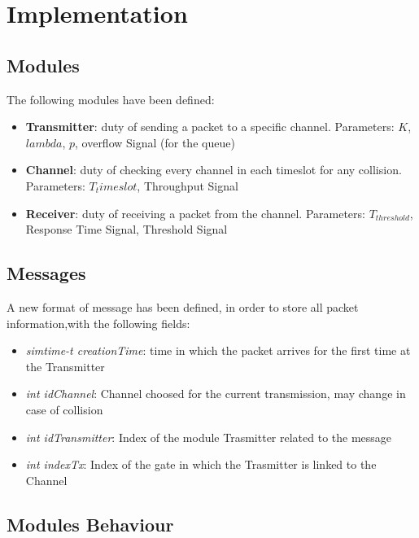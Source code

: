 \section{Implementation}
\subsection{Modules}
The following modules have been defined:
\begin{itemize}
	\item \textbf{Transmitter}: duty of sending a packet to a specific channel. Parameters: $K$, $lambda$, $p$, overflow Signal (for the queue)
	\item \textbf{Channel}: duty of checking every channel in each timeslot for any collision. Parameters: $T_timeslot$, Throughput Signal
	\item \textbf{Receiver}: duty of receiving a packet from the channel. Parameters: $T_{threshold}$, Response Time Signal, Threshold Signal
\end{itemize}
\subsection{Messages}
A new format of message has been defined, in order to store all packet information,with the following fields:
\begin{itemize}
	\item \textit{simtime-t creationTime}: time in which the packet arrives for the first time at the Transmitter
	\item \textit{int idChannel}: Channel choosed for the current transmission, may change in case of collision
	\item \textit{int idTransmitter}: Index of the module Trasmitter related to the message
	\item \textit{int indexTx}: Index of the gate in which the Trasmitter is linked to the Channel
\end{itemize}

\subsection{Modules Behaviour}
